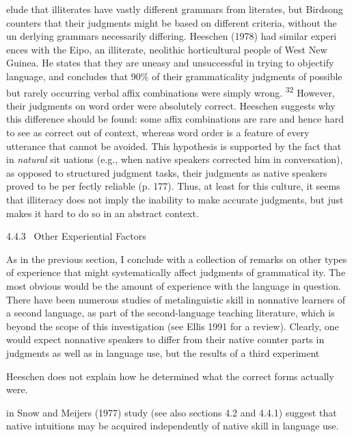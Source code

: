 \begin{styleTextbody}
elude that illiterates have vastly different grammars from literates, but Birdsong counters that their judgments might be based on different criteria, without the un\- derlying grammars necessarily differing. Heeschen (1978) had similar experi\- ences with the Eipo, an illiterate, neolithic horticultural people of West New Guinea. He states that they are {\textquotedbl}uneasy and unsuccessful{\textquotedbl} in trying to objectify language, and concludes that 90\% of their grammaticality judgments of possible but rarely occurring verbal affix combinations were simply wrong. \textsuperscript{32}\textsuperscript{ }However, their judgments on word order were {\textquotedbl}absolutely correct.{\textquotedbl} Heeschen suggests why this difference should be found: some affix combinations are rare and hence hard to see as correct out of context, whereas word order is a feature of every utterance that cannot be avoided. This hypothesis is supported by the fact that in \textit{natural}\textit{ }sit\- uations (e.g., when native speakers corrected him in conversation), as opposed to structured judgment tasks, {\textquotedbl}their judgments as native speakers proved to be per\- fectly reliable{\textquotedbl} (p. 177). Thus, at least for this culture, it seems that illiteracy does not imply the inability to make accurate judgments, but just makes it hard to do so in an abstract context.
\end{styleTextbody}


\begin{styleHeadingviii}
4.4.3 \ Other Experiential Factors
\end{styleHeadingviii}


\begin{styleTextbody}
As in the previous section, I conclude with a collection of remarks on other types of experience that might systematically affect judgments of grammatical\- ity. The most obvious would be the amount of experience with the language in question. There have been numerous studies of metalinguistic skill in nonnative learners of a second language, as part of the second-language teaching literature, which is beyond the scope of this investigation (see Ellis 1991 for a review). Clearly, one would expect nonnative speakers to differ from their native counter\- parts in judgments as well as in language use, but the results of a third experiment
\end{styleTextbody}


\begin{listWWNumxxxvleveli}
\item 
\begin{styleStandard}
Heeschen does not explain how he determined what the correct forms actually were.
\end{styleStandard}


\end{listWWNumxxxvleveli}
\clearpage\setcounter{page}{1}\begin{styleTextbody}
in Snow and Meijer{\textquotesingle}s (1977) study (see also sections 4.2 and 4.4.1) suggest that native intuitions may be acquired independently of native skill in language use.
\end{styleTextbody}


